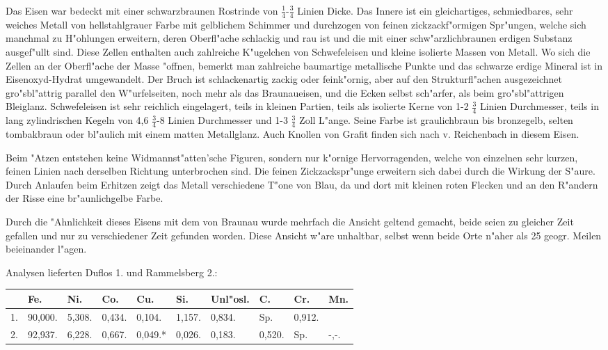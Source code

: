 \documentclass[a4paper, 11pt, oneside]{article}
\begin{document}
Das Eisen war bedeckt mit einer schwarzbraunen Rostrinde von $\frac{1}{4}$-$\frac{3}{4}$ Linien Dicke. Das Innere ist ein gleichartiges, schmiedbares, sehr weiches Metall von hellstahlgrauer Farbe mit gelblichem Schimmer und durchzogen von feinen zickzackf"ormigen Spr"ungen, welche sich manchmal zu H"ohlungen erweitern, deren Oberfl"ache schlackig und rau ist und die mit einer schw"arzlichbraunen erdigen Substanz ausgef"ullt sind. Diese Zellen enthalten auch zahlreiche K"ugelchen von Schwefeleisen und kleine isolierte Massen von Metall. Wo sich die Zellen an der Oberfl"ache der Masse "offnen, bemerkt man zahlreiche baumartige metallische Punkte und das schwarze erdige Mineral ist in Eisenoxyd-Hydrat umgewandelt. Der Bruch ist schlackenartig zackig oder feink"ornig, aber auf den Strukturfl"achen ausgezeichnet gro"sbl"attrig parallel den W"urfelseiten, noch mehr als das Braunaueisen, und die Ecken selbst sch"arfer, als beim gro"sbl"attrigen Bleiglanz. Schwefeleisen ist sehr reichlich eingelagert, teils in kleinen Partien, teils als isolierte Kerne von 1-2 $\frac{3}{4}$ Linien Durchmesser, teils in lang zylindrischen Kegeln von 4,6 $\frac{3}{4}$-8 Linien Durchmesser und 1-3 $\frac{3}{4}$ Zoll L"ange. Seine Farbe ist graulichbraun bis bronzegelb, selten tombakbraun oder bl"aulich mit einem matten Metallglanz. Auch Knollen von Grafit finden sich nach v. Reichenbach in diesem Eisen.

Beim "Atzen entstehen keine Widmannst"atten'sche Figuren, sondern nur k"ornige Hervorragenden, welche von einzelnen sehr kurzen, feinen Linien nach derselben Richtung unterbrochen sind. Die feinen Zickzackspr"unge erweitern sich dabei durch die Wirkung der S"aure. Durch Anlaufen beim Erhitzen zeigt das Metall verschiedene T"one von Blau, da und dort mit kleinen roten Flecken und an den R"andern der Risse eine br"aunlichgelbe Farbe.

Durch die "Ahnlichkeit dieses Eisens mit dem von Braunau wurde mehrfach die Ansicht geltend gemacht, beide seien zu gleicher Zeit gefallen und nur zu verschiedener Zeit gefunden worden. Diese Ansicht w"are unhaltbar, selbst wenn beide Orte n"aher als 25 geogr. Meilen beieinander l"agen.

Analysen lieferten Duflos 1. und Rammelsberg 2.:
\begin{table}[H]
    \centering
    \begin{tabular}{l l l l l l l l l l}
         & Fe. & Ni. & Co. & Cu. & Si. & Unl"osl. & C. & Cr. & Mn. \\ \hline
        1. & 90,000. & 5,308. & 0,434. & 0,104. & 1,157. & 0,834. & Sp. & 0,912. &  \\
        2. & 92,937. & 6,228. & 0,667. & 0,049.* & 0,026. & 0,183. & 0,520. & Sp. & -,-. \\
    \end{tabular}
\end{table}
\end{document}
